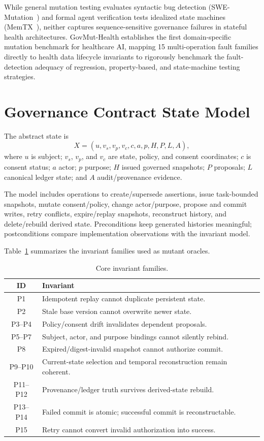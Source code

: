 \documentclass[conference]{IEEEtran}
\begin{document}
While general mutation testing evaluates syntactic bug detection (SWE-Mutation~\cite{swemutation}) and formal agent verification tests idealized state machines (MemTX~\cite{memtx}), neither captures sequence-sensitive governance failures in stateful health architectures. GovMut-Health establishes the first domain-specific mutation benchmark for healthcare AI, mapping 15 multi-operation fault families directly to health data lifecycle invariants to rigorously benchmark the fault-detection adequacy of regression, property-based, and state-machine testing strategies.

\section{Governance Contract State Model}
The abstract state is
\begin{equation}
X=(u,v_s,v_p,v_c,c,a,p,H,P,L,A),
\end{equation}
where $u$ is subject; $v_s$, $v_p$, and $v_c$ are state, policy, and consent coordinates; $c$ is consent status; $a$ actor; $p$ purpose; $H$ issued governed snapshots; $P$ proposals; $L$ canonical ledger state; and $A$ audit/provenance evidence.

The model includes operations to create/supersede assertions, issue task-bounded snapshots, mutate consent/policy, change actor/purpose, propose and commit writes, retry conflicts, expire/replay snapshots, reconstruct history, and delete/rebuild derived state. Preconditions keep generated histories meaningful; postconditions compare implementation observations with the invariant model.

Table~\ref{tab:inv} summarizes the invariant families used as mutant oracles.
\begin{table}[t]
\caption{Core invariant families.}
\label{tab:inv}
\centering\scriptsize
\begin{tabular}{cl}
\toprule
ID & Invariant \\
\midrule
P1 & Idempotent replay cannot duplicate persistent state. \\
P2 & Stale base version cannot overwrite newer state. \\
P3--P4 & Policy/consent drift invalidates dependent proposals. \\
P5--P7 & Subject, actor, and purpose bindings cannot silently rebind. \\
P8 & Expired/digest-invalid snapshot cannot authorize commit. \\
P9--P10 & Current-state selection and temporal reconstruction remain coherent. \\
P11--P12 & Provenance/ledger truth survives derived-state rebuild. \\
P13--P14 & Failed commit is atomic; successful commit is reconstructable. \\
P15 & Retry cannot convert invalid authorization into success. \\
\bottomrule
\end{tabular}
\end{table}
\end{document}
